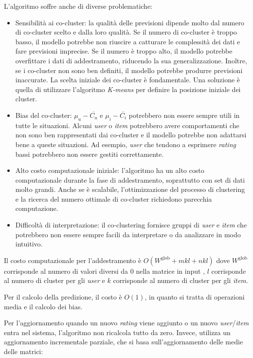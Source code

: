 L'algoritmo soffre anche di diverse problematiche:

\begin{itemize}
  \item Sensibilità ai co-cluster: la qualità delle previsioni dipende molto dal numero di co-cluster scelto e dalla loro qualità. Se il numero di co-cluster è troppo basso, il modello potrebbe non riuscire a catturare le complessità dei dati e fare previsioni imprecise. Se il numero è troppo alto, il modello potrebbe overfittare i dati di addestramento, riducendo la sua generalizzazione. Inoltre, se i co-cluster non sono ben definiti, il modello potrebbe produrre previsioni inaccurate. La scelta iniziale dei co-cluster è fondamentale. Una soluzione è quella di utilizzare l'algoritmo \textit{K-means} per definire la posizione iniziale dei cluster.
  \item Bias del co-cluster: $ \mu_u - \overline{C_u} $ e $ \mu_i - \overline{C_i} $ potrebbero non essere sempre utili in tutte le situazioni. Alcuni \textit{user} o \textit{item} potrebbero avere comportamenti che non sono ben rappresentati dai co-cluster e il modello potrebbe non adattarsi bene a queste situazioni. Ad esempio, \textit{user} che tendono a esprimere \textit{rating} bassi potrebbero non essere gestiti correttamente.
  \item Alto costo computazionale iniziale: l'algoritmo ha un alto costo computazionale durante la fase di addestramento, soprattutto con set di dati molto grandi. Anche se è scalabile, l'ottimizzazione del processo di clustering e la ricerca del numero ottimale di co-cluster richiedono parecchia computazione.
  \item Difficoltà di interpretazione: il co-clustering fornisce gruppi di \textit{user} e \textit{item} che potrebbero non essere sempre facili da interpretare o da analizzare in modo intuitivo.
\end{itemize}

Il costo computazionale per l'addestramento è $ O(W^{\text{glob}} + mkl + nkl) $ dove $ W^{\text{glob}} $ corrisponde al numero di valori diversi da 0 nella matrice in input , $l$ corrisponde al numero di cluster per gli \textit{user} e $k$ corrisponde al numero di cluster per gli \textit{item}.

Per il calcolo della predizione, il costo è $O(1)$, in quanto si tratta di operazioni media e il calcolo dei bias.

Per l'aggiornamento quando un nuovo \textit{rating} viene aggiunto o un nuovo \textit{user}/\textit{item} entra nel sistema, l'algoritmo non ricalcola tutto da zero. Invece, utilizza un aggiornamento incrementale parziale, che si basa sull'aggiornamento delle medie delle matrici:

